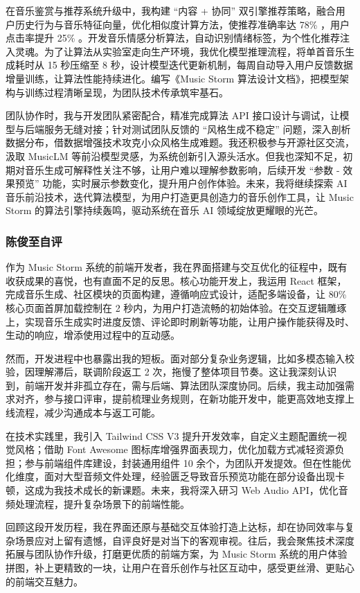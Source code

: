 \documentclass{base}
\numberwithin{figure}{section} %
\begin{document}
在音乐鉴赏与推荐系统升级中，我构建 “内容 + 协同” 双引擎推荐策略，融合用户历史行为与音乐特征向量，优化相似度计算方法，使推荐准确率达 78\% ，用户点击率提升 25\% 。开发音乐情感分析算法，自动识别情绪标签，为个性化推荐注入灵魂。为了让算法从实验室走向生产环境，我优化模型推理流程，将单首音乐生成耗时从 15 秒压缩至 8 秒，设计模型迭代更新机制，每周自动导入用户反馈数据增量训练，让算法性能持续进化。编写《Music Storm 算法设计文档》，把模型架构与训练过程清晰呈现，为团队技术传承筑牢基石。

团队协作时，我与开发团队紧密配合，精准完成算法 API 接口设计与调试，让模型与后端服务无缝对接；针对测试团队反馈的 “风格生成不稳定” 问题，深入剖析数据分布，借数据增强技术攻克小众风格生成难题。我还积极参与开源社区交流，汲取 MusicLM 等前沿模型灵感，为系统创新引入源头活水。但我也深知不足，初期对音乐生成可解释性关注不够，让用户难以理解参数影响，后续开发 “参数 - 效果预览” 功能，实时展示参数变化，提升用户创作体验。未来，我将继续探索 AI 音乐前沿技术，迭代算法模型，为用户打造更具创造力的音乐创作工具，让 Music Storm 的算法引擎持续轰鸣，驱动系统在音乐 AI 领域绽放更耀眼的光芒。

\subsubsection{陈俊至自评}

作为 Music Storm 系统的前端开发者，我在界面搭建与交互优化的征程中，既有收获成果的喜悦，也有直面不足的反思。核心功能开发上，我运用 React 框架，完成音乐生成、社区模块的页面构建，遵循响应式设计，适配多端设备，让 80\% 核心页面首屏加载控制在 2 秒内，为用户打造流畅的初始体验。在交互逻辑雕琢上，实现音乐生成实时进度反馈、评论即时刷新等功能，让用户操作能获得及时、生动的响应，增添使用过程中的互动感。

然而，开发进程中也暴露出我的短板。面对部分复杂业务逻辑，比如多模态输入校验，因理解滞后，联调阶段返工 2 次，拖慢了整体项目节奏。这让我深刻认识到，前端开发并非孤立存在，需与后端、算法团队深度协同。后续，我主动加强需求对齐，参与接口评审，提前梳理业务规则，在新功能开发中，能更高效地支撑上线流程，减少沟通成本与返工可能。

在技术实践里，我引入 Tailwind CSS V3 提升开发效率，自定义主题配置统一视觉风格；借助 Font Awesome 图标库增强界面表现力，优化加载方式减轻资源负担；参与前端组件库建设，封装通用组件 10 余个，为团队开发提效。但在性能优化维度，面对大型音频文件处理，经验匮乏导致音乐预览功能在部分设备出现卡顿，这成为我技术成长的新课题。未来，我将深入研习 Web Audio API，优化音频处理流程，提升复杂场景下的前端性能。

回顾这段开发历程，我在界面还原与基础交互体验打造上达标，却在协同效率与复杂场景应对上留有遗憾，自评良好是对当下的客观审视。往后，我会聚焦技术深度拓展与团队协作升级，打磨更优质的前端方案，为 Music Storm 系统的用户体验拼图，补上更精致的一块，让用户在音乐创作与社区互动中，感受更丝滑、更贴心的前端交互魅力。
\end{document}
